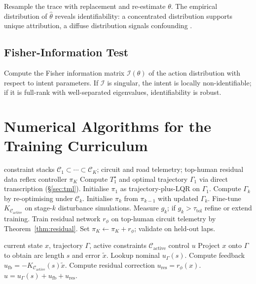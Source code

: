 \documentclass[11pt,twocolumn]{article}
\theoremstyle{definition}
\theoremstyle{remark}
\newcommand{\cC}{\mathcal{C}}
\begin{document}
Resample the trace with replacement and re-estimate $\theta$. The empirical distribution of $\hat\theta$ reveals identifiability: a concentrated distribution supports unique attribution, a diffuse distribution signals confounding \cite{efron1993bootstrap,tibshirani2007bootstrap}.

\subsection{Fisher-Information Test}

Compute the Fisher information matrix $\mathcal{I}(\theta)$ of the action distribution with respect to intent parameters. If $\mathcal{I}$ is singular, the intent is locally non-identifiable; if it is full-rank with well-separated eigenvalues, identifiability is robust.

\section{Numerical Algorithms for the Training Curriculum}
\label{app:algorithms}

\begin{algorithm}[H]
\caption{Curriculum-trained reflex controller}
\label{alg:curriculum}
\begin{algorithmic}[1]
\Require constraint stacks $\cC_1 \subset \cdots \subset \cC_K$; circuit and road telemetry; top-human residual data
\Ensure reflex controller $\pi_K$
\State Compute $T^{\star}_1$ and optimal trajectory $\Gamma_1$ via direct transcription (\S\ref{sec:tml}).
\State Initialise $\pi_1$ as trajectory-plus-LQR on $\Gamma_1$.
  \State Compute $\Gamma_k$ by re-optimising under $\cC_k$.
  \State Initialise $\pi_k$ from $\pi_{k-1}$ with updated $\Gamma_k$.
  \State Fine-tune $K_{\cC_{\mathrm{active}}}$ on stage-$k$ disturbance simulations.
  \State Measure $g_k$; if $g_k > \tau_{\mathrm{tol}}$ refine or extend training.
\EndFor
\State Train residual network $r_\phi$ on top-human circuit telemetry by Theorem~\ref{thm:residual}.
\State Set $\pi_K \leftarrow \pi_K + r_\phi$; validate on held-out laps.
\end{algorithmic}
\end{algorithm}

\begin{algorithm}[H]
\caption{Runtime reflex step}
\label{alg:runtime}
\begin{algorithmic}[1]
\Require current state $x$, trajectory $\Gamma$, active constraints $\cC_{\mathrm{active}}$
\Ensure control $u$
\State Project $x$ onto $\Gamma$ to obtain arc length $s$ and error $\tilde x$.
\State Lookup nominal $u_{\Gamma}(s)$.
\State Compute feedback $u_{\mathrm{fb}} = -K_{\cC_{\mathrm{active}}}(s)\tilde x$.
\State Compute residual correction $u_{\mathrm{res}} = r_\phi(x)$.
\State \Return $u = u_{\Gamma}(s) + u_{\mathrm{fb}} + u_{\mathrm{res}}$.
\end{algorithmic}
\end{algorithm}
\end{document}
